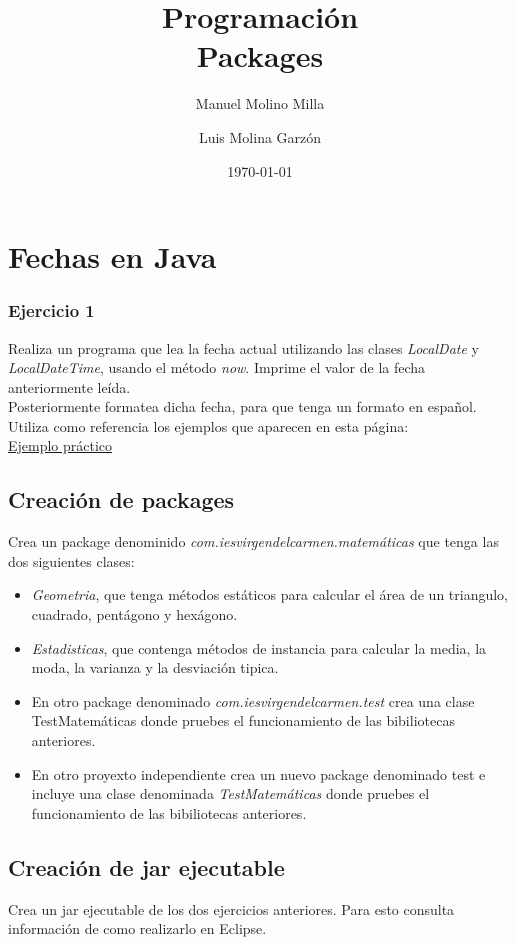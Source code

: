 \documentclass[a4paper,spanish]{article}
\author{Manuel Molino Milla \and Luis Molina Garzón}
\title{\textbf{Programación}
\\Packages}
\date{\today}
\begin{document}
\maketitle
\tableofcontents
\setlongtables


\section*{Fechas en Java}
\subsubsection*{Ejercicio 1}
Realiza un programa que lea la fecha actual utilizando las clases \emph{LocalDate} y \emph{LocalDateTime}, usando el método \emph{now}. Imprime el valor de la fecha anteriormente leída.
\\
Posteriormente formatea dicha fecha, para que tenga un formato en español.\\
Utiliza como referencia los ejemplos que aparecen en esta página:\\
\href{https://www.solvetic.com/tutoriales/article/1345-trabajando-con-fechas-en-java-8/}{Ejemplo práctico}

\subsection*{Creación de packages}
Crea un package denominido \emph{com.iesvirgendelcarmen.matemáticas} que tenga las dos siguientes clases:
\begin{itemize}
\item \emph{Geometria}, que tenga métodos estáticos para calcular el área de un triangulo, cuadrado, pentágono y hexágono.
\item \emph{Estadisticas}, que contenga métodos de instancia para calcular la media, la moda, la varianza y la desviación tipica.
\item En otro package denominado \emph{com.iesvirgendelcarmen.test} crea una clase TestMatemáticas donde pruebes el funcionamiento de las bibiliotecas anteriores.
\item En otro proyexto independiente crea un nuevo package denominado test e incluye una clase denominada \emph{TestMatemáticas} donde pruebes el funcionamiento de las bibiliotecas anteriores.

\end{itemize}

\subsection*{Creación de jar ejecutable}
Crea un jar ejecutable de los dos ejercicios anteriores. Para esto consulta información de como realizarlo en Eclipse.
\end{document}
